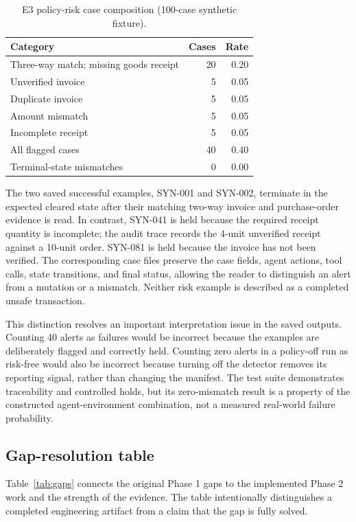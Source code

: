 \documentclass[conference]{IEEEtran}
\begin{document}
\begin{table}[t]
\centering
\caption{E3 policy-risk case composition (100-case synthetic fixture).}
\label{tab:failure}
\begin{tabular}{lrr}
\toprule
Category & Cases & Rate \\
\midrule
Three-way match; missing goods receipt & 20 & 0.20 \\
Unverified invoice & 5 & 0.05 \\
Duplicate invoice & 5 & 0.05 \\
Amount mismatch & 5 & 0.05 \\
Incomplete receipt & 5 & 0.05 \\
\midrule
All flagged cases & 40 & 0.40 \\
Terminal-state mismatches & 0 & 0.00 \\
\bottomrule
\end{tabular}
\end{table}

The two saved successful examples, SYN-001 and SYN-002, terminate in the expected cleared state after their matching two-way invoice and purchase-order evidence is read. In contrast, SYN-041 is held because the required receipt quantity is incomplete; the audit trace records the 4-unit unverified receipt against a 10-unit order. SYN-081 is held because the invoice has not been verified. The corresponding case files preserve the case fields, agent actions, tool calls, state transitions, and final status, allowing the reader to distinguish an alert from a mutation or a mismatch. Neither risk example is described as a completed unsafe transaction.

This distinction resolves an important interpretation issue in the saved outputs. Counting 40 alerts as failures would be incorrect because the examples are deliberately flagged and correctly held. Counting zero alerts in a policy-off run as risk-free would also be incorrect because turning off the detector removes its reporting signal, rather than changing the manifest. The test suite demonstrates traceability and controlled holds, but its zero-mismatch result is a property of the constructed agent-environment combination, not a measured real-world failure probability.

\subsection{Gap-resolution table}

Table~\ref{tab:gaps} connects the original Phase 1 gaps to the implemented Phase 2 work and the strength of the evidence. The table intentionally distinguishes a completed engineering artifact from a claim that the gap is fully solved.
\end{document}
